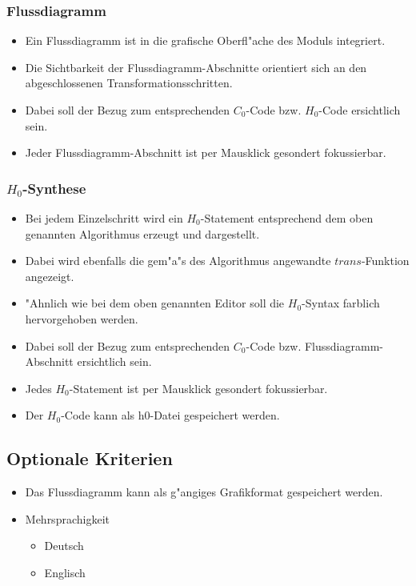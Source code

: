 \begin{itemize}
	\subsubsection{Flussdiagramm}
	\begin{itemize}
    \item Ein Flussdiagramm ist in die grafische Oberfl"ache des Moduls
    integriert.
    \item Die Sichtbarkeit der Flussdiagramm-Abschnitte orientiert sich an den
    abgeschlossenen Transformationsschritten.
    \item Dabei soll der Bezug zum entsprechenden $C_0$-Code bzw. $H_0$-Code
    ersichtlich sein.
    \item Jeder Flussdiagramm-Abschnitt ist per Mausklick gesondert
    fokussierbar.
	\end{itemize}
	
	\subsubsection{$H_0$-Synthese}
	\begin{itemize}
    \item Bei jedem Einzelschritt wird ein $H_0$-Statement entsprechend dem
    oben genannten Algorithmus erzeugt und dargestellt.
    \item Dabei wird ebenfalls die gem"a"s des Algorithmus angewandte $trans$-Funktion angezeigt.
    \item "Ahnlich wie bei dem oben genannten Editor soll die $H_0$-Syntax
    farblich hervorgehoben werden.
    \item Dabei soll der Bezug zum entsprechenden $C_0$-Code bzw.
    Flussdiagramm-Abschnitt ersichtlich sein.
    \item Jedes $H_0$-Statement ist per Mausklick gesondert fokussierbar.
    \item Der $H_0$-Code kann als h0-Datei gespeichert werden.
	\end{itemize}
\end{itemize}

\subsection{Optionale Kriterien}
\begin{itemize}
  \item Das Flussdiagramm kann als g"angiges Grafikformat gespeichert
  werden.
	\item Mehrsprachigkeit
  \begin{itemize}
    \item Deutsch
    \item Englisch
  \end{itemize}
\end{itemize}
